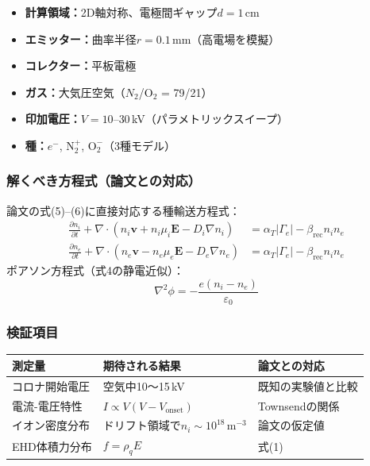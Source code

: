 \documentclass[12pt,a4paper]{ltjsarticle}
\begin{document}
\begin{itemize}[leftmargin=2em]
  \item \textbf{計算領域：}2D軸対称、電極間ギャップ$d = 1$\,cm
  \item \textbf{エミッター：}曲率半径$r = 0.1$\,mm（高電場を模擬）
  \item \textbf{コレクター：}平板電極
  \item \textbf{ガス：}大気圧空気（$N_2$/O$_2$ = 79/21）
  \item \textbf{印加電圧：}$V = 10$--$30$\,kV（パラメトリックスイープ）
  \item \textbf{種：}$e^-$, $\mathrm{N}_2^+$, $\mathrm{O}_2^-$（3種モデル）
\end{itemize}

\subsubsection{解くべき方程式（論文との対応）}

論文の式(5)--(6)に直接対応する種輸送方程式：
\begin{align}
  \frac{\partial n_i}{\partial t}
  + \nabla \cdot (n_i \mathbf{v} + n_i \mu_i \mathbf{E} - D_i \nabla n_i)
  &= \alpha_T |\Gamma_e| - \beta_{\mathrm{rec}} n_i n_e \\
  \frac{\partial n_e}{\partial t}
  + \nabla \cdot (n_e \mathbf{v} - n_e \mu_e \mathbf{E} - D_e \nabla n_e)
  &= \alpha_T |\Gamma_e| - \beta_{\mathrm{rec}} n_i n_e
\end{align}
ポアソン方程式（式4の静電近似）：
\begin{equation}
  \nabla^2 \phi = -\frac{e(n_i - n_e)}{\varepsilon_0}
\end{equation}

\subsubsection{検証項目}

\begin{table}[h]
\centering\sffamily\small
\begin{tabular}{@{}p{4cm}p{4cm}p{3.5cm}@{}}
\toprule
\textbf{測定量} & \textbf{期待される結果} & \textbf{論文との対応} \\
\midrule
コロナ開始電圧 & 空気中10〜15\,kV & 既知の実験値と比較 \\
電流-電圧特性 & $I \propto V(V - V_{\mathrm{onset}})$ & Townsendの関係 \\
イオン密度分布 & ドリフト領域で$n_i \sim 10^{18}\,\mathrm{m}^{-3}$ & 論文の仮定値 \\
EHD体積力分布 & $f = \rho_q E$ & 式(1) \\
\bottomrule
\end{tabular}
\end{table}
\end{document}
